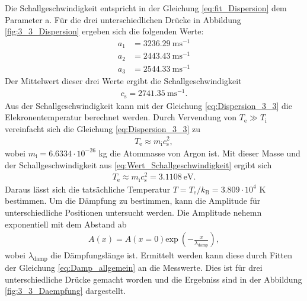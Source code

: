 Die Schallgeschwindigkeit entspricht in der Gleichung \eqref{eq:fit_Dispersion} dem Parameter a. Für die drei unterschiedlichen Drücke in Abbildung \ref{fig:3_3_Dispersion} ergeben sich die folgenden Werte:
\begin{align}
  a_1 & = 3236.29\  \mathrm{m s}^{-1} \\
  a_2 & = 2443.43\  \mathrm{m s}^{-1} \\
  a_3 & = 2544.33\  \mathrm{m s}^{-1}
\end{align}
Der Mittelwert dieser drei Werte ergibt die Schallgeschwindigkeit
\begin{align}
  c_{\mathrm{s}}= 2741.35\  \mathrm{m s}^{-1}.
  \label{eq:Wert_Schallgeschwindigkeit}
\end{align}
Aus der Schallgeschwindigkeit kann mit der Gleichung \eqref{eq:Dispersion_3_3} die Elekronentemperatur berechnet werden. Durch Vervendung von  $T_{\mathrm{e}} \gg T_{\mathrm{i}}$ vereinfacht sich die Gleichung  \eqref{eq:Dispersion_3_3} zu
\begin{align}
  T_{\mathrm{e}} \approx m_{\mathrm{i}} c_{\mathrm{s}}^2,
  \end{align}
wobei $ m_{\mathrm{i}}=6.6334 \cdot 10^{-26}$ kg die Atommasse von Argon ist. Mit dieser Masse und der Schallgeschwindigkeit aus \eqref{eq:Wert_Schallgeschwindigkeit} ergibt sich
\begin{align}
   T_{\mathrm{e}} \approx m_{\mathrm{i}} c_{\mathrm{s}}^2= 3.1108\ \mathrm{eV}.
  \end{align} 
Daraus lässt sich die tatsächliche Temperatur $T=T_{\mathrm{e}}/k_{\mathrm{B}}=3.809 \cdot 10^4$ K bestimmen.  Um die Dämpfung zu bestimmen, kann die Amplitude für unterschiedliche Positionen untersucht werden. Die Amplitude nehemn exponentiell mit dem Abstand ab
\begin{align}
  A(x) = A(x=0) \mathrm{exp}\ \left(- \frac{x}{\lambda_{\mathrm{damp}}}  \right),
  \label{eq:Damp_allgemein}
\end{align}
wobei $\lambda_{\mathrm{damp}}$ die Dämpfungslänge ist. Ermittelt werden kann diese durch Fitten der Gleichung \eqref{eq:Damp_allgemein} an die Messwerte. Dies ist für drei unterschiedliche Drücke gemacht worden und die Ergebniss sind in der Abbildung \ref {fig:3_3_Daempfung} dargestellt. 
